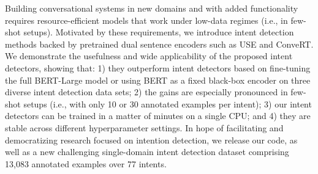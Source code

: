 Building conversational systems in new domains and with added functionality requires resource-efficient models that work under low-data regimes (i.e., in few-shot setups). Motivated by these requirements, we introduce intent detection methods backed by pretrained dual sentence encoders such as USE and ConveRT. We demonstrate the usefulness and wide applicability of the proposed intent detectors, showing that: 1) they outperform intent detectors based on fine-tuning the full BERT-Large model or using BERT as a fixed black-box encoder on three diverse intent detection data sets; 2) the gains are especially pronounced in few-shot setups (i.e., with only 10 or 30 annotated examples per intent); 3) our intent detectors can be trained in a matter of minutes on a single CPU; and 4) they are stable across different hyperparameter settings. In hope of facilitating and democratizing research focused on intention detection, we release our code, as well as a new challenging single-domain intent detection dataset comprising 13,083 annotated examples over 77 intents.
